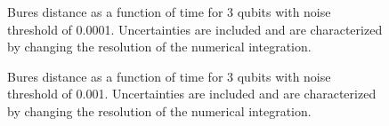 %
%
%
%
%
%

\begin{figure}
\begin{center}
\end{center}
\caption{Bures distance as a function of time for 3 qubits with noise
threshold of 0.0001.  Uncertainties are included and are characterized 
by changing the resolution of the numerical integration.}
\end{figure}

\pagebreak

\begin{figure}
\begin{center}
\end{center}
\caption{Bures distance as a function of time for 3 qubits with noise
threshold of 0.001.  Uncertainties are included and are characterized 
by changing the resolution of the numerical integration.}
\end{figure}

